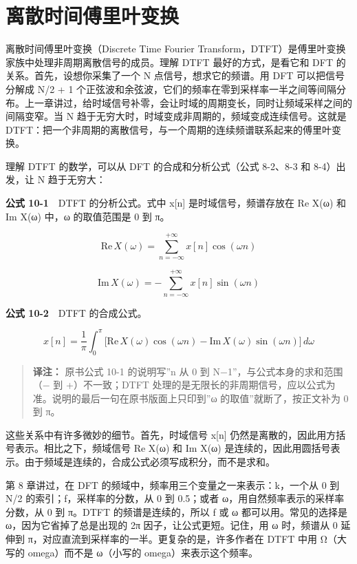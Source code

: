 \section{离散时间傅里叶变换}

离散时间傅里叶变换（Discrete Time Fourier
Transform，DTFT）是傅里叶变换家族中处理非周期离散信号的成员。理解 DTFT
最好的方式，是看它和 DFT 的关系。首先，设想你采集了一个 N
点信号，想求它的频谱。用 DFT 可以把信号分解成 N/2 + 1
个正弦波和余弦波，它们的频率在零到采样率一半之间等间隔分布。上一章讲过，给时域信号补零，会让时域的周期变长，同时让频域采样之间的间隔变窄。当
N 趋于无穷大时，时域变成非周期的，频域变成连续信号。这就是
DTFT：把一个非周期的离散信号，与一个周期的连续频谱联系起来的傅里叶变换。

理解 DTFT 的数学，可以从 DFT 的合成和分析公式（公式 8-2、8-3 和
8-4）出发，让 N 趋于无穷大：

\textbf{公式 10-1}　DTFT 的分析公式。式中 x{[}n{]}
是时域信号，频谱存放在 Re X(ω) 和 Im X(ω) 中，ω 的取值范围是 0 到 π。

\[\mathrm{Re}\,X(\omega) = \sum_{n=-\infty}^{+\infty} x[n]\cos(\omega n)\]

\[\mathrm{Im}\,X(\omega) = -\sum_{n=-\infty}^{+\infty} x[n]\sin(\omega n)\]

\textbf{公式 10-2}　DTFT 的合成公式。

\[x[n] = \frac{1}{\pi}\int_{0}^{\pi} \big[\mathrm{Re}\,X(\omega)\cos(\omega n) - \mathrm{Im}\,X(\omega)\sin(\omega n)\big]\,d\omega\]

\begin{quote}
\textbf{译注：} 原书公式 10-1 的说明写''n 从 0 到
N−1''，与公式本身的求和范围（− 到 +）不一致；DTFT
处理的是无限长的非周期信号，应以公式为准。说明的最后一句在原书版面上只印到''ω
的取值''就断了，按正文补为 0 到 π。
\end{quote}

这些关系中有许多微妙的细节。首先，时域信号 x{[}n{]}
仍然是离散的，因此用方括号表示。相比之下，频域信号 Re X(ω) 和 Im X(ω)
是连续的，因此用圆括号表示。由于频域是连续的，合成公式必须写成积分，而不是求和。

第 8 章讲过，在 DFT 的频域中，频率用三个变量之一来表示：k，一个从 0 到
N/2 的索引；f，采样率的分数，从 0 到 0.5；或者
ω，用自然频率表示的采样率分数，从 0 到 π。DTFT 的频谱是连续的，所以 f 或
ω 都可以用。常见的选择是 ω，因为它省掉了总是出现的 2π
因子，让公式更短。记住，用 ω 时，频谱从 0 延伸到
π，对应直流到采样率的一半。更复杂的是，许多作者在 DTFT 中用 Ω（大写的
omega）而不是 ω（小写的 omega）来表示这个频率。

